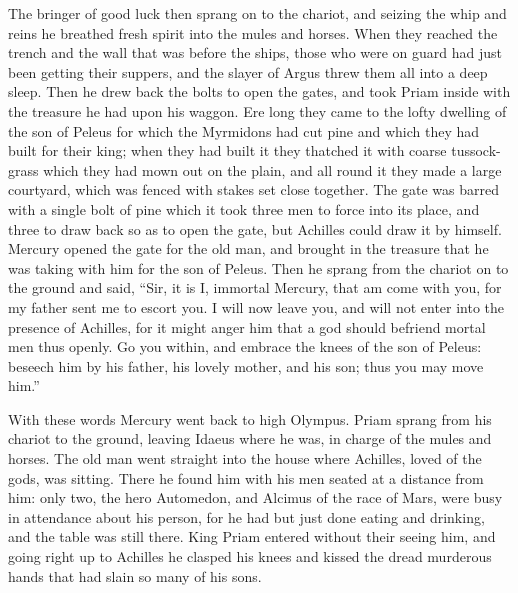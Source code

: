 The bringer of good luck then sprang on to the chariot, and seizing the
whip and reins he breathed fresh spirit into the mules and horses. When
they reached the trench and the wall that was before the ships, those who
were on guard had just been getting their suppers, and the slayer of Argus
threw them all into a deep sleep. Then he drew back the bolts to open the
gates, and took Priam inside with the treasure he had upon his waggon. Ere
long they came to the lofty dwelling of the son of Peleus for which the
Myrmidons had cut pine and which they had built for their king; when they
had built it they thatched it with coarse tussock-grass which they had
mown out on the plain, and all round it they made a large courtyard, which
was fenced with stakes set close together. The gate was barred with a
single bolt of pine which it took three men to force into its place, and
three to draw back so as to open the gate, but Achilles could draw it by
himself. Mercury opened the gate for the old man, and brought in the
treasure that he was taking with him for the son of Peleus. Then he sprang
from the chariot on to the ground and said, “Sir, it is I, immortal
Mercury, that am come with you, for my father sent me to escort you. I
will now leave you, and will not enter into the presence of Achilles, for
it might anger him that a god should befriend mortal men thus openly. Go
you within, and embrace the knees of the son of Peleus: beseech him by his
father, his lovely mother, and his son; thus you may move him.”

With these words Mercury went back to high Olympus. Priam sprang from his
chariot to the ground, leaving Idaeus where he was, in charge of the mules
and horses. The old man went straight into the house where Achilles, loved
of the gods, was sitting. There he found him with his men seated at a
distance from him: only two, the hero Automedon, and Alcimus of the race
of Mars, were busy in attendance about his person, for he had but just
done eating and drinking, and the table was still there. King Priam
entered without their seeing him, and going right up to Achilles he
clasped his knees and kissed the dread murderous hands that had slain so
many of his sons.

